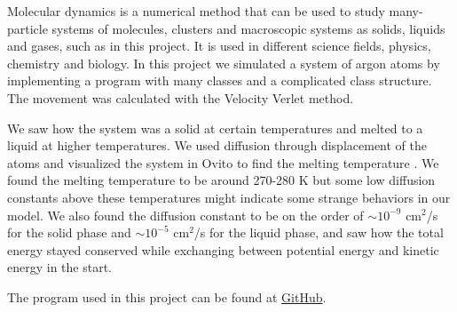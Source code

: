 Molecular dynamics is a numerical method that can be used to study many-particle systems of molecules, clusters and macroscopic systems as solids, liquids and gases, such as in this project. It is used in different science fields, physics, chemistry and biology. In this project we simulated a system of argon atoms by implementing a program with many classes and a complicated class structure. The movement was calculated with the Velocity Verlet method. 

We saw how the system was a solid at certain temperatures and melted to a liquid at higher temperatures. We used diffusion through displacement of the atoms and visualized the system in Ovito to find the melting temperature \cite{ovito}. We found the melting temperature to be around 270-280 K but some low diffusion constants above these temperatures might indicate some strange behaviors in our model. We also found the diffusion constant to be on the order of $\sim 10^{-9}$ cm$^2$/s for the solid phase and $\sim 10^{-5}$ cm$^2$/s for the liquid phase, and saw how the total energy stayed conserved while exchanging between potential energy and kinetic energy in the start. 

The program used in this project can be found at \href{https://github.com/kjetka/project5}{GitHub}.